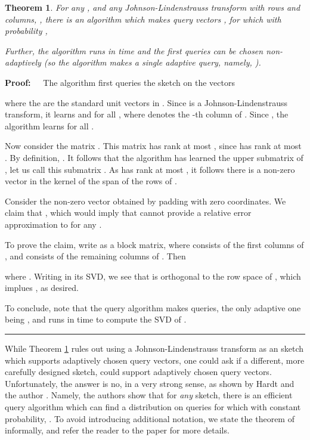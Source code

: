 \documentclass[11pt]{article}
\newtheorem{theorem}{Theorem}
\newenvironment{proof}{\begin{trivlist} \item {\bf Proof:~~}}
  {\qed\end{trivlist}}
\def\qed{\hfill\rule{2mm}{2mm}}
\begin{document}
\begin{theorem}\label{thm:jlBreak}
For any , and any Johnson-Lindenstrauss transform  with  rows and  columns, , 
there is an algorithm which makes
 query vectors , for which with probability , 

Further, the algorithm runs in  time and the first  queries can be chosen 
non-adaptively (so the algorithm makes a single adaptive query, namely, ). 
\end{theorem}
\begin{proof}
The algorithm first queries the sketch on the vectors

where the  are the standard unit vectors in . Since  is a Johnson-Lindenstrauss
transform, it learns  and  for all , where 
denotes the -th column of . Since
, the algorithm learns 
 for all . 

Now consider the  matrix . This matrix
has rank at most , since  has rank at most . By definition, . 
It follows that the algorithm has learned the upper  submatrix of , let us call
this submatrix . As  has rank at most , it follows there is a non-zero vector  
in the kernel of the span of the rows of . 

Consider the non-zero vector  obtained by padding  with  zero coordinates. 
We claim that , which would imply that  cannot provide a relative error approximation
to  for any . 

To prove the claim, write  as a block matrix, where  consists of the first  columns
of , and  consists of the remaining  columns of . Then

where . Writing  in its SVD, we see that  is orthogonal to the row space
of , which implues , as desired. 

To conclude, note that the query algorithm makes  queries, the only adaptive one being , and runs
in  time to compute the SVD of . 
\end{proof}
While Theorem \ref{thm:jlBreak} rules out using a Johnson-Lindenstrauss transform as an  sketch
which supports adaptively chosen query vectors, one could ask if a different, more carefully designed
 sketch, could support adaptively chosen query vectors. Unfortunately, the answer is no, in a very
strong sense, as shown by Hardt and the author \cite{hw13}. Namely, the authors show that for {\it any}  sketch, there is
an efficient query algorithm which can find a distribution on queries  for which with constant
probability, . To avoid introducing additional
notation, we state the theorem of \cite{hw13} informally, and refer the reader to the paper for more details.  
\end{document}
